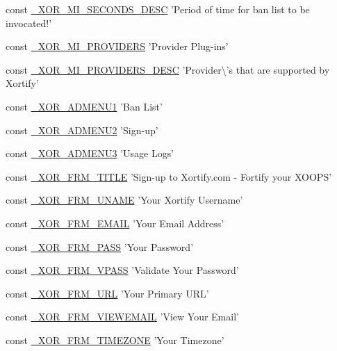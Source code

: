 \begin{DoxyCompactItemize}
\item 
const \hyperlink{modinfo_8php_ad18744bd726d3401cd929bf117fd9688}{\-\_\-\-X\-O\-R\-\_\-\-M\-I\-\_\-\-S\-E\-C\-O\-N\-D\-S\-\_\-\-D\-E\-S\-C} 'Period of time for ban list to be invocated!'
\item 
const \hyperlink{modinfo_8php_a3577341953a8b85fe104f829d0c15a9d}{\-\_\-\-X\-O\-R\-\_\-\-M\-I\-\_\-\-P\-R\-O\-V\-I\-D\-E\-R\-S} 'Provider Plug-\/ins'
\item 
const \hyperlink{modinfo_8php_a461258effe4c47da6688263d2fc08855}{\-\_\-\-X\-O\-R\-\_\-\-M\-I\-\_\-\-P\-R\-O\-V\-I\-D\-E\-R\-S\-\_\-\-D\-E\-S\-C} 'Provider\textbackslash{}'s that are supported by Xortify'
\item 
const \hyperlink{modinfo_8php_aa1ec3ad910b652de032d02e89ef3b806}{\-\_\-\-X\-O\-R\-\_\-\-A\-D\-M\-E\-N\-U1} 'Ban List'
\item 
const \hyperlink{modinfo_8php_a95a892b4875491ced8fbd2f549d930d7}{\-\_\-\-X\-O\-R\-\_\-\-A\-D\-M\-E\-N\-U2} 'Sign-\/up'
\item 
const \hyperlink{modinfo_8php_a008c720fa75affb52127965361361fd8}{\-\_\-\-X\-O\-R\-\_\-\-A\-D\-M\-E\-N\-U3} 'Usage Logs'
\item 
const \hyperlink{modinfo_8php_a5fbb901963def6307c1d4e336f4d8a1e}{\-\_\-\-X\-O\-R\-\_\-\-F\-R\-M\-\_\-\-T\-I\-T\-L\-E} 'Sign-\/up to Xortify.\-com -\/ Fortify your X\-O\-O\-P\-S'
\item 
const \hyperlink{modinfo_8php_ad303fffdec43e07cc313f06c371b4393}{\-\_\-\-X\-O\-R\-\_\-\-F\-R\-M\-\_\-\-U\-N\-A\-M\-E} 'Your Xortify Username'
\item 
const \hyperlink{modinfo_8php_a8bf3964f64499bbc2f5e9e5d1e99dfa4}{\-\_\-\-X\-O\-R\-\_\-\-F\-R\-M\-\_\-\-E\-M\-A\-I\-L} 'Your Email Address'
\item 
const \hyperlink{modinfo_8php_aa2de0bd8f44fcfb1c248ebdd0086632a}{\-\_\-\-X\-O\-R\-\_\-\-F\-R\-M\-\_\-\-P\-A\-S\-S} 'Your Password'
\item 
const \hyperlink{modinfo_8php_a8dd4a36daee5d790f556324d6675c9ea}{\-\_\-\-X\-O\-R\-\_\-\-F\-R\-M\-\_\-\-V\-P\-A\-S\-S} 'Validate Your Password'
\item 
const \hyperlink{modinfo_8php_a865f5fdbdd7f08c0efded6731ac41eda}{\-\_\-\-X\-O\-R\-\_\-\-F\-R\-M\-\_\-\-U\-R\-L} 'Your Primary U\-R\-L'
\item 
const \hyperlink{modinfo_8php_a4274dc2c27cca45dfa79fa7438c02eb0}{\-\_\-\-X\-O\-R\-\_\-\-F\-R\-M\-\_\-\-V\-I\-E\-W\-E\-M\-A\-I\-L} 'View Your Email'
\item 
const \hyperlink{modinfo_8php_a3b15f8ba04e01f80e4bad0064d9a2196}{\-\_\-\-X\-O\-R\-\_\-\-F\-R\-M\-\_\-\-T\-I\-M\-E\-Z\-O\-N\-E} 'Your Timezone'

\end{DoxyCompactItemize}
